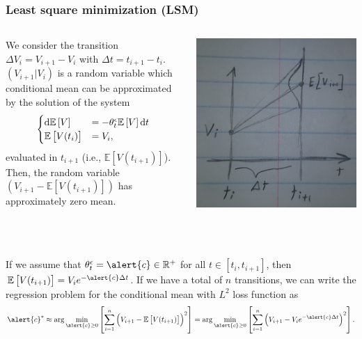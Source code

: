 \documentclass[aspectratio=169]{beamer}\usepackage[utf8]{inputenc}
\newcommand{\R}{\mathbb{R}}
\newcommand{\E}{\mathbb{E}}
\begin{document}
\begin{frame}\frametitle{Least square minimization (LSM)}\label{S1}
{\small
\begin{columns}[c]

We consider the transition $\Delta V_i=V_{i+1}-V_i$ with $\Delta t=t_{i+1}-t_i$. $(V_{i+1}|V_i)$ is a random variable which conditional mean can be approximated by the solution of the system
\begin{equation*}
\begin{cases}
\dif \E\left[V\right]&=-\theta_t^\epsilon\E\left[V\right]\dif t\\
\E\left[V(t_i)\right]&=V_i,
\end{cases}
\end{equation*}
evaluated in $t_{i+1}$ (i.e., $\E\left[V(t_{i+1})\right]$). Then, the random variable $(V_{i+1}-\E\left[V(t_{i+1})\right])$ has approximately zero mean.

\includegraphics[width=0.7\columnwidth]{1.jpg}

\end{columns}}
\quad\\
\quad\\
If we assume that $\theta_t^\epsilon=\alert{c}\in\R^+$ for all $t\in[t_i,t_{i+1}]$, then $\E\left[V(t_{i+1})\right]=V_ie^{-\alert{c}\Delta t}$. If we have a total of $n$ transitions, we can write the regression problem for the conditional mean with $L^2$ loss function as
\begin{equation}
\alert{c}^*\approx\arg\min_{\alert{c}\geq0}\left[\sum_{i=1}^n\left(V_{i+1}-\E\left[V(t_{i+1})\right]\right)^2\right]=\arg\min_{\alert{c}\geq0}\left[\sum_{i=1}^n\left(V_{i+1}-V_ie^{-\alert{c}\Delta t}\right)^2\right].
\label{Eq-1}
\end{equation}

\end{frame}
\end{document}
